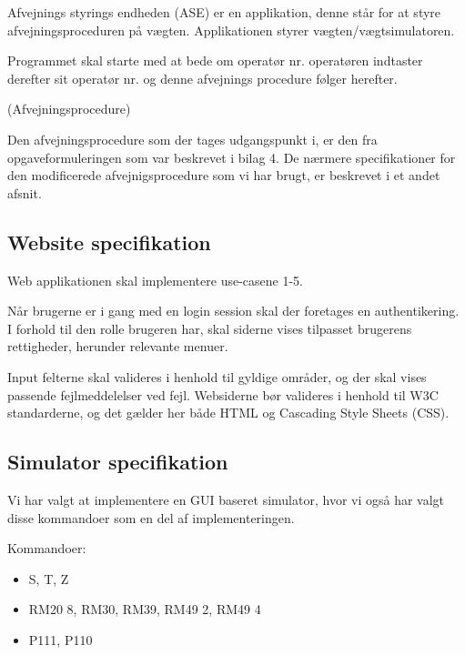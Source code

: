 \documentclass[a4paper]{article}
\begin{document}
Afvejnings styrings endheden (ASE) er en applikation, denne står for at styre afvejningsproceduren på vægten. Applikationen styrer vægten/vægtsimulatoren. 

Programmet skal starte med at bede om operatør nr. operatøren indtaster derefter sit operatør nr. og denne afvejnings procedure følger herefter.

 (Afvejningsprocedure)

Den afvejningsprocedure som der tages udgangspunkt i, er den fra opgaveformuleringen som var beskrevet i bilag 4. De nærmere specifikationer for den modificerede afvejnigsprocedure som vi har brugt, er beskrevet i et andet afsnit. 


\subsection{Website specifikation} %

Web applikationen skal implementere use-casene 1-5.

Når brugerne er i gang med en login session skal der foretages en authentikering. I forhold til den rolle brugeren har, skal siderne vises tilpasset brugerens rettigheder, herunder relevante menuer.

Input felterne skal valideres i henhold til gyldige områder, og der skal vises passende fejlmeddelelser ved fejl. Websiderne bør valideres i henhold til W3C standarderne, og det gælder her både HTML og Cascading Style Sheets (CSS).


\subsection{Simulator specifikation} %

Vi har valgt at implementere en GUI baseret simulator, hvor vi også har valgt disse kommandoer som en del af implementeringen.

Kommandoer:

\begin{itemize}
  \item S, T, Z
  \item RM20 8, RM30, RM39, RM49 2, RM49 4
  \item P111, P110
\end{itemize}

\end{document}
